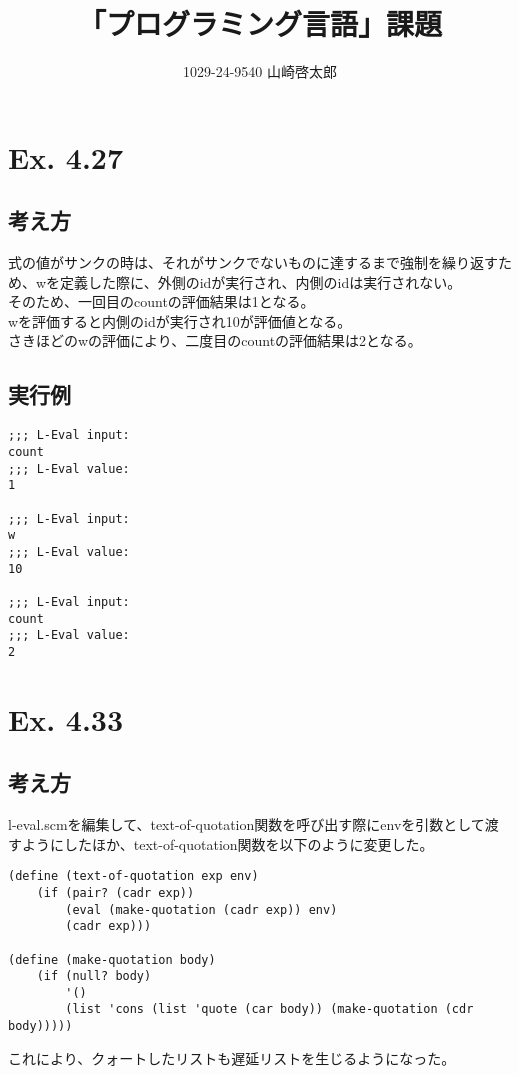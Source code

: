 \documentclass[a4paper,12pt]{article}
\title{「プログラミング言語」課題}
\author{1029-24-9540 山崎啓太郎}
\begin{document}
\lstset{numbers=left,basicstyle=\small}
\maketitle

\section{Ex. 4.27}
\subsection{考え方}
式の値がサンクの時は、それがサンクでないものに達するまで強制を繰り返すため、wを定義した際に、外側のidが実行され、内側のidは実行されない。\\
そのため、一回目のcountの評価結果は1となる。\\
wを評価すると内側のidが実行され10が評価値となる。\\
さきほどのwの評価により、二度目のcountの評価結果は2となる。\\
\subsection{実行例}
{\small
\begin{verbatim}
;;; L-Eval input:
count
;;; L-Eval value:
1

;;; L-Eval input:
w
;;; L-Eval value:
10

;;; L-Eval input:
count
;;; L-Eval value:
2

\end{verbatim}
}

\section{Ex. 4.33}
\subsection{考え方}
l-eval.scmを編集して、text-of-quotation関数を呼び出す際にenvを引数として渡すようにしたほか、text-of-quotation関数を以下のように変更した。\\
{\small
\begin{verbatim}
(define (text-of-quotation exp env)
	(if (pair? (cadr exp))
		(eval (make-quotation (cadr exp)) env)
		(cadr exp)))

(define (make-quotation body)
	(if (null? body)
		'()
		(list 'cons (list 'quote (car body)) (make-quotation (cdr body)))))
\end{verbatim}
}
これにより、クォートしたリストも遅延リストを生じるようになった。
\end{document}
